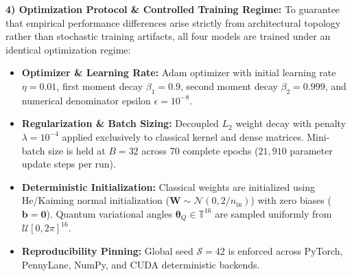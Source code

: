\documentclass[journal]{IEEEtran}
\begin{document}
\textbf{4) Optimization Protocol \& Controlled Training Regime:}
To guarantee that empirical performance differences arise strictly from architectural topology rather than stochastic training artifacts, all four models are trained under an identical optimization regime:
\begin{itemize}
    \item \textbf{Optimizer \& Learning Rate:} Adam optimizer with initial learning rate $\eta = 0.01$, first moment decay $\beta_1 = 0.9$, second moment decay $\beta_2 = 0.999$, and numerical denominator epsilon $\epsilon = 10^{-8}$.
    \item \textbf{Regularization \& Batch Sizing:} Decoupled $L_2$ weight decay with penalty $\lambda = 10^{-4}$ applied exclusively to classical kernel and dense matrices. Mini-batch size is held at $B = 32$ across 70 complete epochs ($21{,}910$ parameter update steps per run).
    \item \textbf{Deterministic Initialization:} Classical weights are initialized using He/Kaiming normal initialization ($\mathbf{W} \sim \mathcal{N}(0, 2/n_{\mathrm{in}})$) with zero biases ($\mathbf{b} = \mathbf{0}$). Quantum variational angles $\boldsymbol{\theta}_Q \in \mathbb{T}^{16}$ are sampled uniformly from $\mathcal{U}[0, 2\pi]^{16}$.
    \item \textbf{Reproducibility Pinning:} Global seed $\mathcal{S} = 42$ is enforced across PyTorch, PennyLane, NumPy, and CUDA deterministic backends.
\end{itemize}
\end{document}
